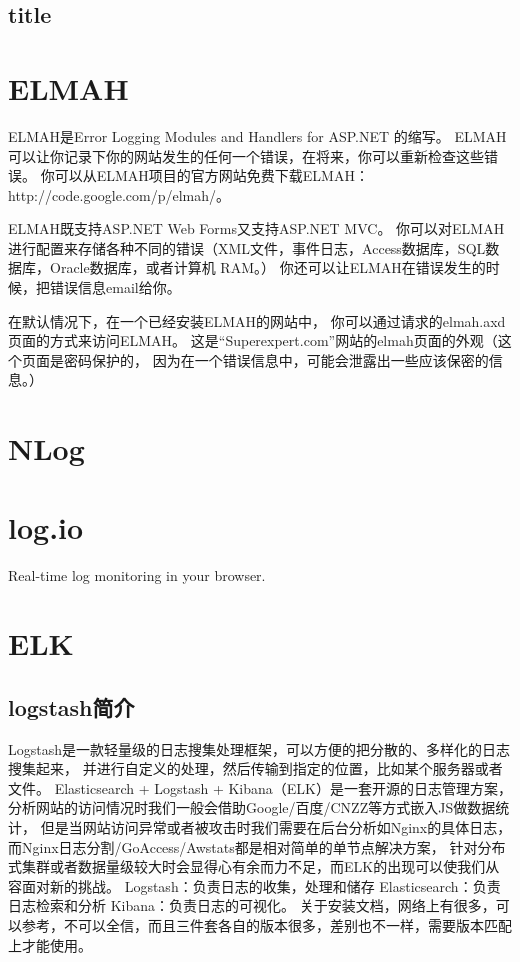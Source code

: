 \documentclass{book}
\begin{document}
\subsection{title}



\section{ELMAH}

ELMAH是Error Logging Modules and Handlers for ASP.NET 的缩写。
ELMAH可以让你记录下你的网站发生的任何一个错误，在将来，你可以重新检查这些错误。
你可以从ELMAH项目的官方网站免费下载ELMAH：http://code.google.com/p/elmah/。

ELMAH既支持ASP.NET Web Forms又支持ASP.NET MVC。
你可以对ELMAH进行配置来存储各种不同的错误（XML文件，事件日志，Access数据库，SQL数据库，Oracle数据库，或者计算机 RAM。）
你还可以让ELMAH在错误发生的时候，把错误信息email给你。

在默认情况下，在一个已经安装ELMAH的网站中，
你可以通过请求的elmah.axd页面的方式来访问ELMAH。
这是“Superexpert.com”网站的elmah页面的外观（这个页面是密码保护的，
因为在一个错误信息中，可能会泄露出一些应该保密的信息。）

\section{NLog}

\section{log.io}

Real-time log monitoring in your browser.

\section{ELK}

\subsection{logstash简介}

Logstash是一款轻量级的日志搜集处理框架，可以方便的把分散的、多样化的日志搜集起来，
并进行自定义的处理，然后传输到指定的位置，比如某个服务器或者文件。
Elasticsearch + Logstash + Kibana（ELK）是一套开源的日志管理方案，
分析网站的访问情况时我们一般会借助Google/百度/CNZZ等方式嵌入JS做数据统计，
但是当网站访问异常或者被攻击时我们需要在后台分析如Nginx的具体日志，
而Nginx日志分割/GoAccess/Awstats都是相对简单的单节点解决方案，
针对分布式集群或者数据量级较大时会显得心有余而力不足，而ELK的出现可以使我们从容面对新的挑战。
Logstash：负责日志的收集，处理和储存
Elasticsearch：负责日志检索和分析
Kibana：负责日志的可视化。
关于安装文档，网络上有很多，可以参考，不可以全信，而且三件套各自的版本很多，差别也不一样，需要版本匹配上才能使用。
\end{document}
